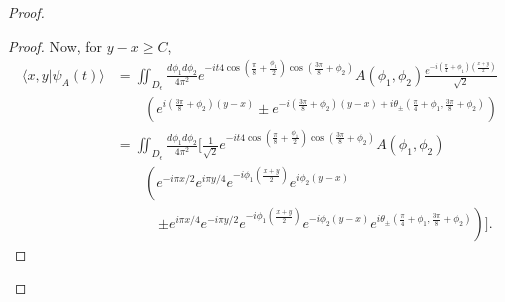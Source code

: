 \documentclass[../thesis-main/thesis-main]{subfiles}
\begin{document}
\begin{proof}
\begin{proof}
Now, for $y-x\geq C$, 
\begin{align*}
\langle x,y|\psi_{A}(t)\rangle & = \iint_{D_{\epsilon}}
  \frac{d\phi_{1}d\phi_{2}}{4\pi^{2}}
  e^{-it 4\cos(\frac{\pi}{8}+\frac{\phi_{1}}{2})
        \cos(\frac{3\pi}{8}+\phi_{2})} A(\phi_{1},\phi_{2})\frac{e^{-i\left(\frac{\pi}{4}+\phi_{1}\right)
       \left(\frac{x+y}{2}\right)}}{\sqrt{2}} \\
 & \qquad \left(e^{i\left(\frac{3\pi}
       {8}+\phi_{2}\right)\left(y-x\right)}\pm e^{-i\left(\frac{3\pi}{8}
       +\phi_{2}\right)
     \left(y-x\right)+
     i\theta_{\pm}(\frac{\pi}{4}+\phi_{1},\frac{3\pi}{8}+\phi_{2})}
      \right)\\
 & = \iint_{D_{\epsilon}}\frac{d\phi_{1}d\phi_{2}}{4\pi^{2}}
      \bigg[\frac{1}{\sqrt{2}} e^{-it 4\cos(\frac{\pi}{8} + \frac{\phi_{1}}{2}) 
      \cos(\frac{3\pi}{8}+\phi_{2})} A(\phi_{1},\phi_{2}) \\
&    \qquad \left( e^{-i\pi x/2} e^{i\pi y/4} e^{-i\phi_{1}\left(\frac{x+y}{2}\right)}
 	 e^{i\phi_{2}\left(y-x\right)}\right.\\
& \qquad\quad\left.\pm  e^{i \pi x/4} e^{-i\pi y/2} e^{-i\phi_{1}
      \left(\frac{x+y}{2}\right)}
 	 e^{-i\phi_{2}\left(y-x\right)} e^{i \theta_{\pm}\left(\frac{\pi}{4} 
             + \phi_1 , \frac{3\pi}{8} + 
 	 \phi_2\right)} \right)\bigg].
\end{align*}


\end{proof}
\end{proof}
\end{document}
